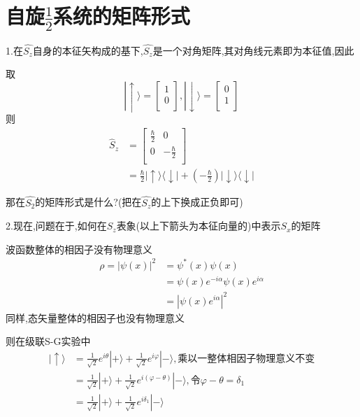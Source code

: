 \documentclass[lang=cn,15pt]{elegantbook}
\begin{document}
 \section{自旋$\frac{1}{2}$系统的矩阵形式}
 
 1.在$\hat{S_z}$自身的本征矢构成的基下,$\hat{S_z}$是一个对角矩阵,其对角线元素即为本征值,因此

 取\begin{equation*}
 	|\uparrow \rangle =\left[ \begin{array}{c}
 		1\\
 		0\\
 	\end{array} \right] ,|\downarrow \rangle =\left[ \begin{array}{c}
 		0\\
 		1\\
 	\end{array} \right] 
 \end{equation*}
 则\begin{equation*}
 	\begin{split}
 		\hat{S}_z&=\left[ \begin{matrix}
 			\frac{\hbar}{2}&		0\\
 			0&		-\frac{\hbar}{2}\\
 		\end{matrix} \right] 
 		\\
 		&=\frac{\hbar}{2}|\uparrow \rangle \langle \downarrow |+\left( -\frac{\hbar}{2} \right) |\downarrow \rangle \langle \downarrow |
 	\end{split}
 \end{equation*}
 
 那在$\hat{S_2}$的矩阵形式是什么?(把在$\hat{S_z}$的上下换成正负即可)
 
 2.现在,问题在于,如何在$S_z $表象(以上下箭头为本征向量的)中表示$S_x $的矩阵
 
 波函数整体的相因子没有物理意义
 \begin{equation*}
 	\begin{split}
 		\rho =|\psi \left( x \right) |^2&=\psi ^*\left( x \right) \psi \left( x \right) 
 		\\
 		&=\psi \left( x \right) e^{-i\alpha}\psi \left( x \right) e^{i\alpha}
 		\\
 		&=|\psi \left( x \right) e^{i\alpha}|^2
 	\end{split}
 \end{equation*}
 同样,态矢量整体的相因子也没有物理意义
 
 则在级联S-G实验中
 \begin{equation*}
 	\begin{split}
 		|\uparrow \rangle &=\frac{1}{\sqrt{2}}e^{i\theta}|+\rangle +\frac{1}{\sqrt{2}}e^{i\varphi}|-\rangle ,\text{乘以一整体相因子物理意义不变}
 		\\
 		&=\frac{1}{\sqrt{2}}|+\rangle +\frac{1}{\sqrt{2}}e^{i\left( \varphi -\theta \right)}|-\rangle ,\text{令}\varphi -\theta =\delta _1
 		\\
 		&=\frac{1}{\sqrt{2}}|+\rangle +\frac{1}{\sqrt{2}}e^{i\delta _1}|-\rangle 
 	\end{split}
 \end{equation*}
 
\end{document}
